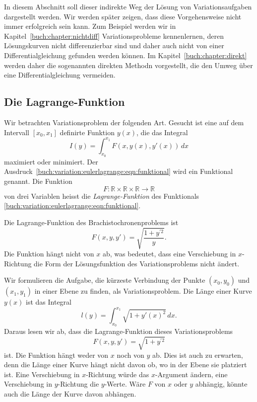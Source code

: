In diesem Abschnitt soll dieser indirekte Weg der Lösung von
Variationsaufgaben dargestellt werden.
Wir werden später zeigen, dass diese Vorgehensweise nicht immer
erfolgreich sein kann.
Zum Beispiel werden wir in Kapitel~\ref{buch:chapter:nichtdiff}
Variationsprobleme kennenlernen, deren Lösungskurven nicht
differenzierbar sind und daher auch nicht von einer Differentialgleichung
gefunden werden können.
Im Kapitel~\ref{buch:chapter:direkt} werden daher die sogenannten
direkten Methodn vorgestellt, die den Umweg über eine
Differentialgleichung vermeiden.

%
%
\subsection{Die Lagrange-Funktion
\label{buch:variation:eulerlagrange:subsection:lagrange-funktion}}
Wir betrachten Variationsproblem der folgenden Art.
Gesucht ist eine auf dem Intervall $[x_0,x_1]$ definirte
Funktion $y(x)$, die das Integral
\begin{equation}
I(y)
=
\int_{x_0}^{x_1}
F(x, y(x), y'(x))
\,dx
\label{buch:variation:eulerlagrange:eqn:funktional}
\end{equation}
maximiert oder minimiert.
Der Ausdruck~\eqref{buch:variation:eulerlagrange:eqn:funktional}
wird ein Funktional genannt.
Die Funktion
\[
F
\colon
\mathbb{R}\times
\mathbb{R}\times
\mathbb{R}
\to
\mathbb{R}
\]
von drei Variablen heisst die {\em Lagrange-Funktion}
des Funktionals \eqref{buch:variation:eulerlagrange:eqn:funktional}.

\begin{beispiel}
Die Lagrange-Funktion des Brachistochronenproblems ist
\[
F(x,y,y')
=
\sqrt{ \frac{1+y^{\prime 2}}{y} }.
\]
Die Funktion hängt nicht von $x$ ab, was bedeutet, dass eine
Verschiebung in $x$-Richtung die Form der Lösungsfunktion des
Variationsproblems nicht ändert.
\end{beispiel}

\begin{beispiel}
\label{buch:variation:eulerlagrange:beispiel:gerade}
Wir formulieren die Aufgabe, die kürzeste Verbindung der Punkte
$(x_0,y_0)$ und $(x_1,y_1)$ in einer Ebene zu finden, als Variationsproblem.
Die Länge einer Kurve $y(x)$ ist das Integral
\[
l(y)
=
\int_{x_0}^{x_1}
\sqrt{1+y'(x)^2}\,dx.
\]
Daraus lesen wir ab, dass die Lagrange-Funktion dieses Variationsproblems
\begin{equation}
F(x,y,y') = \sqrt{1+y^{\prime 2}}
\label{buch:variation:eulerlagrange:eqn:geradeL}
\end{equation}
ist.
Die Funktion hängt weder von $x$ noch von $y$ ab.
Dies ist auch zu erwarten, denn die Länge einer Kurve hängt nicht davon
ob, wo in der Ebene sie platziert ist.
Eine Verschiebung in $x$-Richtung würde das $x$-Argument ändern,
eine Verschiebung in $y$-Richtung die $y$-Werte.
Wäre $F$ von $x$ oder $y$ abhängig, könnte auch die Länge der Kurve
davon abhängen.
\end{beispiel}

